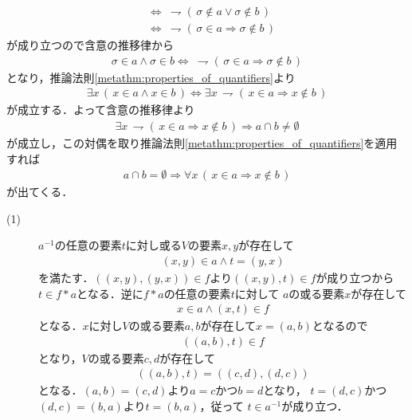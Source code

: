 \begin{prf}
\begin{align}
			&\Longleftrightarrow\ \rightharpoondown (\, \sigma \notin a \vee \sigma \notin b\, ) \\
			&\Longleftrightarrow\ \rightharpoondown (\, \sigma \in a \Longrightarrow \sigma \notin b\, )
		\end{align}
		が成り立つので含意の推移律から
		\begin{align}
			\sigma \in a \wedge \sigma \in b \Longleftrightarrow\
			\rightharpoondown (\, \sigma \in a \Longrightarrow \sigma \notin b\, )
		\end{align}
		となり，推論法則\ref{metathm:properties_of_quantifiers}より
		\begin{align}
			\exists x\, (\, x \in a \wedge x \in b\, ) \Longleftrightarrow
			\exists x\, \rightharpoondown (\, x \in a \Longrightarrow x \notin b\, )
		\end{align}
		が成立する．よって含意の推移律より
		\begin{align}
			\exists x\, \rightharpoondown (\, x \in a \Longrightarrow x \notin b\, )
			\Longrightarrow a \cap b \neq \emptyset
		\end{align}
		が成立し，この対偶を取り推論法則\ref{metathm:properties_of_quantifiers}を適用すれば
		\begin{align}
			a \cap b = \emptyset \Longrightarrow \forall x\, (\, x \in a \Longrightarrow x \notin b\, )
		\end{align}
		が出てくる．
		\QED
	\end{prf}
	
	\begin{screen}
		\begin{thm}
			
		\end{thm}
	\end{screen}
	
	\begin{prf}\mbox{}
		\begin{description}
			\item[(1)] $a^{-1}$の任意の要素$t$に対し或る$V$の要素$x,y$が存在して
				\begin{align}
					(x,y) \in a \wedge t = (y,x)
				\end{align}
				を満たす．$((x,y),(y,x)) \in f$より$((x,y),t) \in f$が成り立つから
				$t \in f \ast a$となる．逆に$f \ast a$の任意の要素$t$に対して
				$a$の或る要素$x$が存在して
				\begin{align}
					x \in a \wedge (x,t) \in f
				\end{align}
				となる．$x$に対し$V$の或る要素$a,b$が存在して$x=(a,b)$となるので
				\begin{align}
					((a,b),t) \in f
				\end{align}
				となり，$V$の或る要素$c,d$が存在して
				\begin{align}
					((a,b),t) = ((c,d),(d,c))
				\end{align}
				となる．$(a,b) = (c,d)$より$a=c$かつ$b=d$となり，
				$t = (d,c)$かつ$(d,c)=(b,a)$より$t=(b,a)$，従って
				$t \in a^{-1}$が成り立つ．
		\end{description}
	\end{prf}